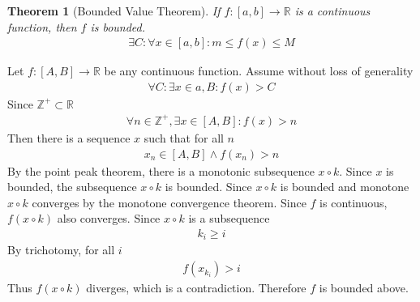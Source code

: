 \documentclass{amsart}
\numberwithin{equation}{section}
\let\oldendproof\endproof
\renewenvironment{proof}[1][\proofname]{%
  \setcounter{case}{0}
  \setcounter{step}{0}
  \oldproof[#1]%
}{\oldendproof}
\theoremstyle{plain}
\newtheorem{theorem}{Theorem}[section]
\theoremstyle{definition}
\theoremstyle{remark}
\begin{document}
\begin{theorem}[Bounded Value Theorem]
  If $f:[a,b]\to \mathbb{R}$ is a continuous function, then $f$ is bounded.
  \begin{align}
    \exists C: \forall x\in [a,b]: m\leq f(x) \leq M
  \end{align}
\end{theorem}
\begin{proof}
  Let $f:[A,B]\to \mathbb{R}$ be any continuous function.
  Assume without loss of generality
  \begin{align}
    \forall C: \exists x\in{a,B}: f(x) > C
  \end{align}
  Since $\mathbb{Z}^+\subset \mathbb{R}$
  \begin{align}
    \forall n\in\mathbb{Z}^+, \exists x \in [A,B]: f(x) >n
  \end{align}
  Then there is a sequence $x$ such that for all $n$
  \begin{align}
    x_n\in[A,B] \land f(x_n)>n
  \end{align}
  By the point peak theorem, there is a monotonic subsequence $x\circ k$.
  Since $x$ is bounded, the subsequence $x\circ k$ is bounded.
  Since $x\circ k$ is bounded and monotone $x\circ k$ converges by the monotone convergence theorem.
  Since $f$ is continuous, $f(x\circ k)$ also converges.
  Since $x\circ k$ is a subsequence
  \begin{align}
    k_i \geq i
  \end{align}
  By trichotomy, for all $i$
  \begin{align}
    f(x_{k_i}) > i
  \end{align}
  Thus $f(x\circ k)$ diverges, which is a contradiction. 
  Therefore $f$ is bounded above.
\end{proof}
\end{document}
